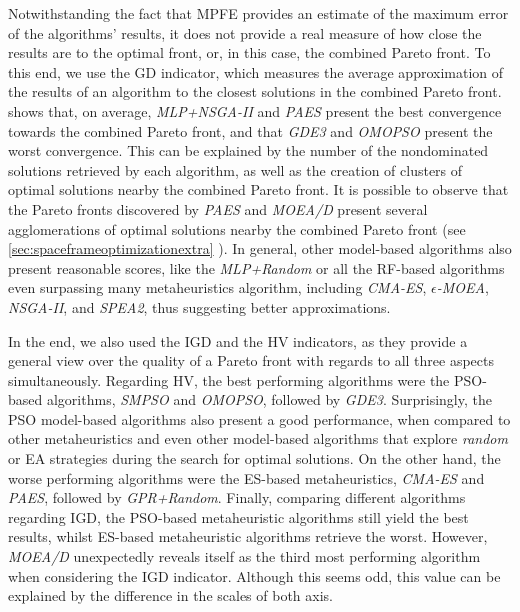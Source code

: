 Notwithstanding the fact that \ac{MPFE} provides an estimate of the maximum error of the algorithms' results, it does not provide a real measure of how close the results are to the optimal front, or, in this case, the combined Pareto front. To this end, we use the \ac{GD} indicator, which measures the average approximation of the results of an algorithm to the closest solutions in the combined Pareto front.  shows that, on average, \textit{MLP+NSGA-II} and \textit{PAES} present the best convergence towards the combined Pareto front, and that \textit{GDE3} and \textit{OMOPSO} present the worst convergence. This can be explained by the number of the nondominated solutions retrieved by each algorithm, as well as the creation of clusters of optimal solutions nearby the combined Pareto front. It is possible to observe that the Pareto fronts discovered by \textit{PAES} and \textit{MOEA/D} present several agglomerations of optimal solutions nearby the combined Pareto front (see \cref{sec:spaceframeoptimizationextra} ). In general, other model-based algorithms also present reasonable scores, like the \textit{MLP+Random} or all the \ac{RF}-based algorithms even surpassing many metaheuristics algorithm, including \textit{CMA-ES}, \textit{$\epsilon$-MOEA}, \textit{\ac{NSGA-II}}, and \textit{\ac{SPEA2}}, thus suggesting better approximations.

In the end, we also used the \ac{IGD} and the \ac{HV} indicators, as they provide a general view over the quality of a Pareto front with regards to all three aspects simultaneously. Regarding \ac{HV}, the best performing algorithms were the \ac{PSO}-based algorithms, \textit{SMPSO} and \textit{OMOPSO}, followed by \textit{GDE3}. Surprisingly, the \ac{PSO} model-based algorithms also present a good performance, when compared to other metaheuristics and even other model-based algorithms that explore \textit{random} or \ac{EA} strategies during the search for optimal solutions. On the other hand, the worse performing algorithms were the \ac{ES}-based metaheuristics, \textit{CMA-ES} and \textit{PAES}, followed by \textit{GPR+Random}. Finally, comparing different algorithms regarding \ac{IGD}, the \ac{PSO}-based metaheuristic algorithms still yield the best results, whilst \ac{ES}-based metaheuristic algorithms retrieve the worst. However, \textit{MOEA/D} unexpectedly reveals itself as the third most performing algorithm when considering the \ac{IGD} indicator. Although this seems odd, this value can be explained by the difference in the scales of both axis.

